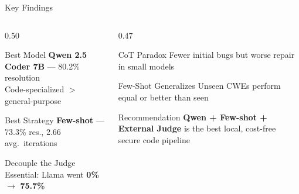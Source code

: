 \documentclass[aspectratio=169]{beamer}
\begin{document}
\begin{frame}{Key Findings}
  \begin{columns}[T]
    \begin{column}{0.50\textwidth}
      \begin{block}{Best Model}
        \textbf{Qwen 2.5 Coder 7B} --- 80.2\% resolution \\
        Code-specialized $>$ general-purpose
      \end{block}
      \vspace{0.35em}
      \begin{block}{Best Strategy}
        \textbf{Few-shot} --- 73.3\% res., 2.66 avg.\ iterations
      \end{block}
      \vspace{0.35em}
      \begin{block}{Decouple the Judge}
        Essential: Llama went \textbf{0\%} $\rightarrow$ \textbf{75.7\%}
      \end{block}
    \end{column}
    \begin{column}{0.47\textwidth}
      \begin{block}{CoT Paradox}
        Fewer initial bugs but worse repair in small models
      \end{block}
      \vspace{0.35em}
      \begin{block}{Few-Shot Generalizes}
        Unseen CWEs perform equal or better than seen
      \end{block}
      \vspace{0.35em}
      \begin{alertblock}{Recommendation}
        \textbf{Qwen + Few-shot + External Judge} is the best local, cost-free secure code pipeline
      \end{alertblock}
    \end{column}
  \end{columns}
\end{frame}
\end{document}
